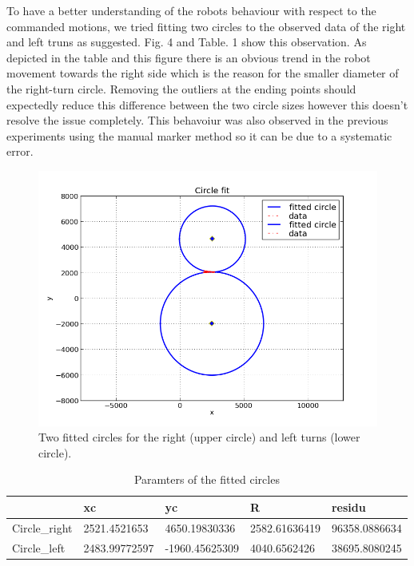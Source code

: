 \documentclass{scrartcl}
\begin{document}
To have a better understanding of the robots behaviour with respect to the commanded motions, we tried fitting two circles to the observed data of the right and left truns as suggested. Fig. 4 and Table. 1 show this observation. As depicted in the table and this figure there is an obvious trend in the robot movement towards the right side which is the reason for the smaller diameter of the right-turn circle. Removing the outliers at the ending points should expectedly reduce this difference between the two circle sizes however this doesn't resolve the issue completely. This behavoiur was also observed in the previous experiments using the manual marker method so it can be due to a systematic error.\\


\begin{figure}[H]
\centering
\begin{minipage}{.5\textwidth}
  \centering
  \includegraphics[width=1\linewidth]{img_second_run/Circle_fit.png}
\end{minipage}%

\caption{Two fitted circles for the right (upper circle) and left turns (lower circle). }
\label{fig:circles}
\end{figure}



\begin{table}[h]
\begin{tabular}{|l|l|l|l|l|}
\hline
              & xc            & yc             & R             & residu        \\ \hline
Circle\_right & 2521.4521653  & 4650.19830336  & 2582.61636419 & 96358.0886634 \\ \hline
Circle\_left  & 2483.99772597 & -1960.45625309 & 4040.6562426  & 38695.8080245 \\ \hline
\end{tabular}
\caption{Paramters of the fitted circles}
\label{my-label}
\end{table}
\end{document}
